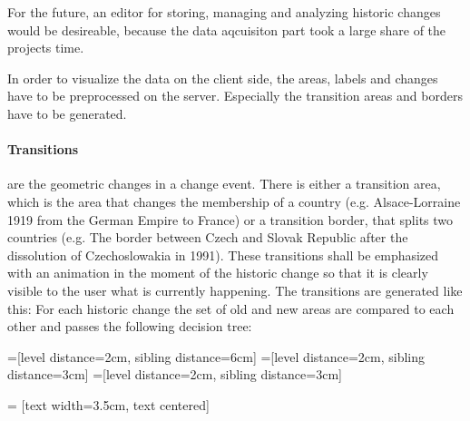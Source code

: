 For the future, an editor for storing, managing and analyzing historic changes would be desireable, because the data aqcuisiton part took a large share of the projects time.

In order to visualize the data on the client side, the areas, labels and changes have to be preprocessed on the server. Especially the transition areas and borders have to be generated.

\paragraph{Transitions} are the geometric changes in a change event. There is either a transition area, which is the area that changes the membership of a country (e.g. Alsace-Lorraine 1919 from the German Empire to France) or a transition border, that splits two countries (e.g. The border between Czech and Slovak Republic after the dissolution of Czechoslowakia in 1991). These transitions shall be emphasized with an animation in the moment of the historic change so that it is clearly visible to the user what is currently happening. The transitions are generated like this: For each historic change the set of old and new areas are compared to each other and passes the following decision tree:

=[level distance=2cm, sibling distance=6cm]
=[level distance=2cm, sibling distance=3cm]
=[level distance=2cm, sibling distance=3cm]

 = [text width=3.5cm, text centered]

